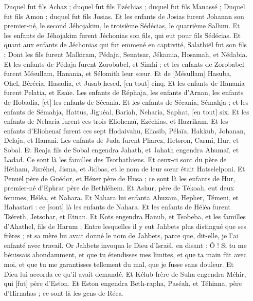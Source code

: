 \begin{multicols}{2}
Duquel fut fils Achaz ; duquel fut fils Ezéchias ; duquel fut fils Manassé ;
Duquel fut fils Amon ; duquel fut fils Josias.
Et les enfants de Josias furent Johanan son premier-né, le second Jéhojakim, le troisième Sédécias, le quatrième Sallum.
Et les enfants de Jéhojakim furent Jéchonias son fils, qui eut pour fils Sédécias.
Et quant aux enfants de Jéchonias qui fut emmené en captivité, Salathiël fut son fils ;
Dont les fils furent Malkiram, Pédaja, Senatsar, Jékamia, Hosamah, et Nédabia.
Et les enfants de Pédaja furent Zorobabel, et Simhi ; et les enfants de Zorobabel furent Mésullam, Hanania, et Sélomith leur sœur.
Et de [Mésullam] Hasuba, Ohel, Bérécia, Hasadia, et Jusab-hesed, [en tout] cinq.
Et les enfants de Hanania furent Pelatia, et Esaïe. Les enfants de Réphaja, les enfants d'Arnan, les enfants de Hobadia, [et] les enfants de Sécania.
Et les enfants de Sécania, Sémahja ; et les enfants de Sémahja, Hattus, Jiguéal, Bariah, Neharia, Saphat, [en tout] six.
Et les enfants de Neharia furent ces trois Eliohenaï, Ezéchias, et Hazrikam.
Et les enfants d'Eliohenaï furent ces sept Hodaivahu, Eliasib, Pélaïa, Hakkub, Johanan, Delaja, et Hanani.
\VerseOne{}Les enfants de Juda furent Pharez, Hetsron, Carmi, Hur, et Sobal.
Et Reaja fils de Sobal engendra Jahath, et Jahath engendra Ahumaï, et Ladad. Ce sont là les familles des Tsorhathiens.
Et ceux-ci sont du père de Hétham, Jizréhel, Jisma, et Jidbas, et le nom de leur sœur était Hatselelponi.
Et Penuël père de Guédor, et Hézer père de Husa ; ce sont là les enfants de Hur, premier-né d'Ephrat père de Bethléhem.
Et Ashur, père de Tékoah, eut deux femmes, Héléa, et Nahara.
Et Nahara lui enfanta Ahuzam, Hepher, Témeni, et Hahastari : ce [sont] là les enfants de Nahara.
Et les enfants de Héléa furent Tséreth, Jetsohar, et Etnan.
Et Kots engendra Hanub, et Tsobeba, et les familles d'Ahathel, fils de Harum ;
Entre lesquelles il y eut Jahbets plus distingué que ses frères ; et sa mère lui avait donné le nom de Jahbets, parce que, dit-elle, je l'ai enfanté avec travail.
Or Jahbets invoqua le Dieu d'Israël, en disant : Ô ! Si tu me bénissais abondamment, et que tu étendisses mes limites, et que ta main fût avec moi, et que tu me garantisses tellement du mal, que je fusse sans douleur. Et Dieu lui accorda ce qu'il avait demandé.
Et Kélub frère de Suha engendra Méhir, qui [fut] père d'Eston.
Et Eston engendra Beth-rapha, Paséah, et Téhinna, père d'Hirnahas ; ce sont là les gens de Réca.

\end{multicols}
